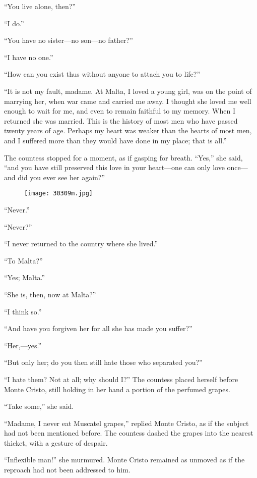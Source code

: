 “You live alone, then?”

“I do.”

“You have no sister—no son—no father?”

“I have no one.”

“How can you exist thus without anyone to attach you to life?”

“It is not my fault, madame. At Malta, I loved a young girl, was on the
point of marrying her, when war came and carried me away. I thought she
loved me well enough to wait for me, and even to remain faithful to my
memory. When I returned she was married. This is the history of most
men who have passed twenty years of age. Perhaps my heart was weaker
than the hearts of most men, and I suffered more than they would have
done in my place; that is all.”

The countess stopped for a moment, as if gasping for breath. “Yes,” she
said, “and you have still preserved this love in your heart—one can
only love once—and did you ever see her again?”

\begin{figure}[ht]
\texttt{[image: 30309m.jpg]}
\end{figure}

“Never.”

“Never?”

“I never returned to the country where she lived.”

“To Malta?”

“Yes; Malta.”

“She is, then, now at Malta?”

“I think so.”

“And have you forgiven her for all she has made you suffer?”

“Her,—yes.”

“But only her; do you then still hate those who separated you?”

“I hate them? Not at all; why should I?” The countess placed herself
before Monte Cristo, still holding in her hand a portion of the
perfumed grapes.

“Take some,” she said.

“Madame, I never eat Muscatel grapes,” replied Monte Cristo, as if the
subject had not been mentioned before. The countess dashed the grapes
into the nearest thicket, with a gesture of despair.

“Inflexible man!” she murmured. Monte Cristo remained as unmoved as if
the reproach had not been addressed to him.

